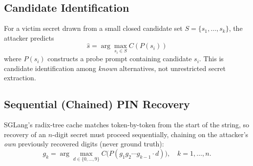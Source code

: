 \documentclass[11pt]{article}
\begin{document}
\subsection{Candidate Identification}
For a victim secret drawn from a small closed candidate set
$S=\{s_1,\dots,s_k\}$, the attacker predicts
\begin{equation}
\hat s = \arg\max_{s_i \in S} C(P(s_i))
\end{equation}
where $P(s_i)$ constructs a probe prompt containing candidate $s_i$.
This is candidate identification among \emph{known} alternatives, not
unrestricted secret extraction.

\subsection{Sequential (Chained) PIN Recovery}
SGLang's radix-tree cache matches token-by-token from the start of the
string, so recovery of an $n$-digit secret must proceed sequentially,
chaining on the attacker's \emph{own} previously recovered digits (never
ground truth):
\begin{equation}
g_k = \arg\max_{d\in\{0,\dots,9\}} C\big(P(g_1 g_2 \cdots g_{k-1}\cdot d)\big),\quad k=1,\dots,n.
\end{equation}
\end{document}
